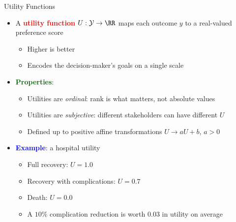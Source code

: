 \documentclass[
  10pt,
  ignorenonframetext,
]{beamer}
\providecommand{\tightlist}{%
  \setlength{\itemsep}{0pt}\setlength{\parskip}{0pt}}
\begin{document}
\begin{frame}{Utility Functions}
\label{utility-functions}
\begin{itemize}
\tightlist
\item
  A \textbf{\textcolor{red}{utility function}}
  \(U: \mathcal{Y} \to \RR\) maps each outcome \(y\) to a real-valued
  preference score

  \begin{itemize}
  \tightlist
  \item
    Higher is better
  \item
    Encodes the decision-maker's goals on a single scale
  \end{itemize}
\item
  \textbf{\textcolor{darkgreen}{Properties}}:

  \begin{itemize}
  \tightlist
  \item
    Utilities are \emph{ordinal}: rank is what matters, not absolute
    values
  \item
    Utilities are \emph{subjective}: different stakeholders can have
    different \(U\)
  \item
    Defined up to positive affine transformations \(U \to a U + b\),
    \(a > 0\)
  \end{itemize}
\item
  \textbf{\textcolor{blue}{Example}}: a hospital utility

  \begin{itemize}
  \tightlist
  \item
    Full recovery: \(U = 1.0\)
  \item
    Recovery with complications: \(U = 0.7\)
  \item
    Death: \(U = 0.0\)
  \item
    A \(10\%\) complication reduction is worth \(0.03\) in utility on
    average
  \end{itemize}
\end{itemize}
\end{frame}
\end{document}
